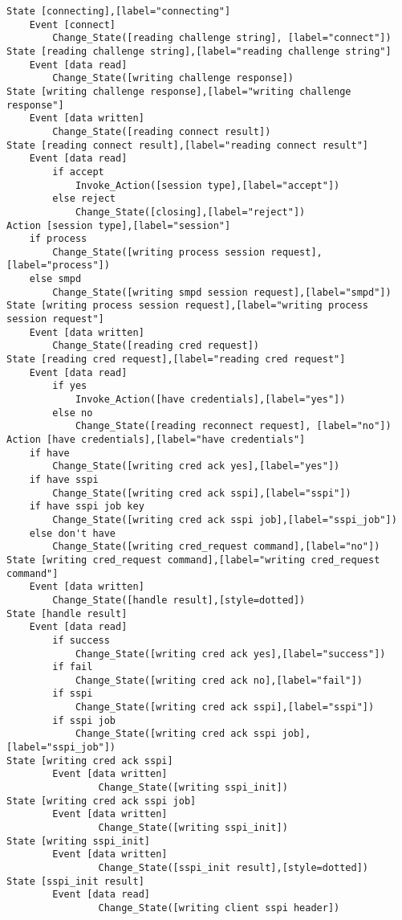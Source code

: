 \begin{comment}
This is the state machine for the smpd connect command.
Graph [smpd connect],
      [size="7.5, 10"]
\end{comment}
\begin{verbatim}
State [connecting],[label="connecting"]
	Event [connect]
		Change_State([reading challenge string], [label="connect"])
State [reading challenge string],[label="reading challenge string"]
	Event [data read]
		Change_State([writing challenge response])
State [writing challenge response],[label="writing challenge response"]
	Event [data written]
		Change_State([reading connect result])
State [reading connect result],[label="reading connect result"]
	Event [data read]
		if accept
			Invoke_Action([session type],[label="accept"])
		else reject
			Change_State([closing],[label="reject"])
Action [session type],[label="session"]
	if process
		Change_State([writing process session request],[label="process"])
	else smpd
		Change_State([writing smpd session request],[label="smpd"])
State [writing process session request],[label="writing process session request"]
	Event [data written]
		Change_State([reading cred request])
State [reading cred request],[label="reading cred request"]
	Event [data read]
		if yes
			Invoke_Action([have credentials],[label="yes"])
		else no
			Change_State([reading reconnect request], [label="no"])
Action [have credentials],[label="have credentials"]
	if have
		Change_State([writing cred ack yes],[label="yes"])
	if have sspi
		Change_State([writing cred ack sspi],[label="sspi"])
	if have sspi job key
		Change_State([writing cred ack sspi job],[label="sspi_job"])
	else don't have
		Change_State([writing cred_request command],[label="no"])
State [writing cred_request command],[label="writing cred_request command"]
	Event [data written]
		Change_State([handle result],[style=dotted])
State [handle result]
	Event [data read]
		if success
			Change_State([writing cred ack yes],[label="success"])
		if fail
			Change_State([writing cred ack no],[label="fail"])
		if sspi
			Change_State([writing cred ack sspi],[label="sspi"])
		if sspi job
			Change_State([writing cred ack sspi job],[label="sspi_job"])
State [writing cred ack sspi]
        Event [data written]
                Change_State([writing sspi_init])
State [writing cred ack sspi job]
		Event [data written]
				Change_State([writing sspi_init])
State [writing sspi_init]
        Event [data written]
                Change_State([sspi_init result],[style=dotted])
State [sspi_init result]
        Event [data read]
                Change_State([writing client sspi header])

\end{verbatim}
